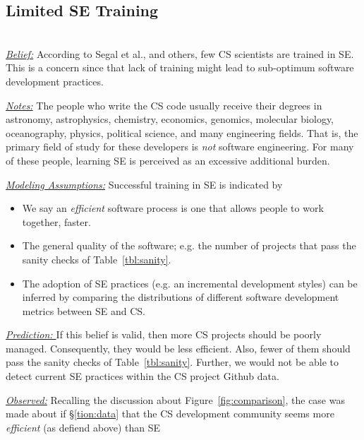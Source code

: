 \documentclass[sigconf]{acmart}
\newcommand{\bi}{\begin{itemize}}
\newcommand{\ei}{\end{itemize}}
\begin{document}
  








\subsection{Limited SE Training} ~\\
\noindent \textit{\underline{Belief:}} According to Segal et al.,
and others\cite{segal07_enduser, basili08_hpc, carver13_perception, easterbrook_cs, sanders08_risk}, few CS scientists are trained in SE.
This is a concern since that lack of training might lead to sub-optimum software
development practices.

\noindent \textit{\underline{Notes:}} 
The people who write the CS code usually
receive their degrees in
astronomy, astrophysics, chemistry, economics, genomics, molecular biology, oceanography, physics, political science, and many engineering fields.
That is, the primary field of study for these developers is {\em not}
software engineering. For many of these people,
learning SE is perceived as an excessive additional burden\cite{boyle09_lessons}. 

\noindent \textit{\underline{Modeling Assumptions:}} 
Successful training in SE is indicated by
\bi
\item We say an {\em efficient} software process is one that allows  people to work together, faster. 
\item The general quality of the software; e.g. the number of projects that pass the sanity checks of Table~\ref{tbl:sanity}.
\item The adoption of SE practices (e.g. an incremental development styles) can be inferred by comparing the distributions of different software development metrics between SE and CS.
\ei

\noindent \textit{\underline{Prediction: }} If this belief is valid, then more CS
projects should be poorly managed. Consequently, they would be less efficient. Also, fewer of them should
pass the sanity checks of Table~\ref{tbl:sanity}.
Further, we would not be able to detect current SE  practices within the CS project Github data.

\noindent \textit{\underline{Observed:}}
Recalling  the discussion about 
Figure~\ref{fig:comparison},
the case was made about if \S\ref{tion:data} that the CS development community
seems more {\em efficient} (as defiend above) than SE 
\end{document}
